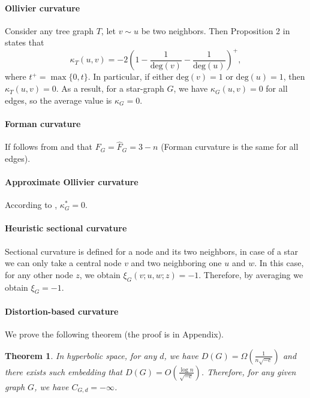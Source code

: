 \documentclass{article} %
\newtheorem{theorem}{Theorem}[section]
\begin{document}
\paragraph{Ollivier curvature} 
Consider any tree graph $T$, let $v \sim u$ be two neighbors. Then Proposition 2 in~\citep{jost2014ollivier} states that
\begin{equation}\label{eq:ollivier_tree}
	\kappa_T(u,v) = -2\left(1 - \frac{1}{\mathrm{deg}(v)} - \frac{1}{\mathrm{deg}(u)}\right)^+, 
\end{equation}
where $t^+ = \max\{0,t\}$. In particular, if either $\mathrm{deg}(v) = 1$ or $\mathrm{deg}(u) = 1$, then $\kappa_T(u,v) = 0$.  As a result, for a star-graph $G$, we have $\kappa_G(u,v) = 0$ for all edges, so the average value is $\kappa_G = 0$.

\paragraph{Forman curvature}
If follows from  and  that
$F_G = \hat F_G = 3-n$ (Forman curvature is the same for all edges).

\paragraph{Approximate Ollivier curvature} According to , $\kappa_G^* = 0$.

\paragraph{Heuristic sectional curvature}

Sectional curvature is defined for a node and its two neighbors, in case of a star we can only take a central node $v$ and two neighboring one $u$ and $w$. In this case, for any other node $z$, we obtain $\xi_G(v;u,w;z) = -1$. Therefore, by averaging we obtain $\xi_G = -1$.

\paragraph{Distortion-based curvature} 
We prove the following theorem (the proof is in Appendix).

\begin{theorem}\label{thm:star_distortion}
In hyperbolic space, for any $d$, we have $D(G) = \Omega\left(\frac{1}{n\sqrt{-c}}\right)$ and there exists such embedding that $D(G) = O\left(\frac{\log n}{\sqrt{-c}}\right)$. Therefore, for any given graph $G$, we have $C_{G,d} = -\infty$.
\end{theorem}
\end{document}
